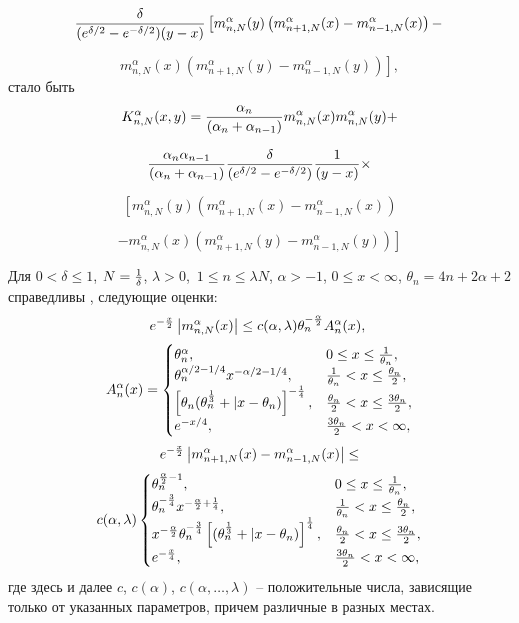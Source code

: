 $$
{\delta\over(e^{\delta/2}-e^{-\delta/2})(y-x)}
\left[m_{n,N}^\alpha(y)\left(m_{n+1,N}^\alpha(x)-m_{n-1,N}^\alpha(x)
\right)-\right.
$$

$$
\left.m_{n,N}^\alpha(x)\left(m_{n+1,N}^\alpha(y)-
m_{n-1,N}^\alpha(y)\right)\right],
$$
стало быть
$$
K_{n,N}^\alpha(x,y)={\alpha_n\over(\alpha_n+\alpha_{n-1})}
m_{n,N}^{\alpha}(x)m_{n,N}^{\alpha}(y)+
$$

$$
{\alpha_n\alpha_{n-1}
\over(\alpha_n+\alpha_{n-1})}{\delta\over(e^{\delta/2}-e^{-\delta/2})} {1\over(y-x)}\times
$$

$$
\left[m_{n,N}^\alpha(y)\left(m_{n+1,N}^\alpha(x)-
m_{n-1,N}^\alpha(x)
\right)\right.
$$

\begin{equation*}\label{Kernel2}
\left.-m_{n,N}^\alpha(x)
\left(m_{n+1,N}^\alpha(y)-m_{n-1,N}^\alpha(y)
\right)\right]
\end{equation*}

Для $0<\delta\le1$, $N={1\over\delta}$, $\lambda>0$,\ $1\le n\le\lambda N$,  $\alpha>-1$, $0\le x<\infty$, $\theta_n=4n+2\alpha+2$ справедливы \cite{Ram1}, \cite{Ram5} следующие оценки:
$$
e^{-{x\over2}}\left|m_{n,N}^\alpha(x)\right|\le c(\alpha,\lambda)\theta_n^{-{\alpha\over2}}A_n^\alpha(x),\
$$
\begin{equation*}
A_n^\alpha(x)=\begin{cases}
\theta_n^{\alpha},&  0\le x\le \frac{1}{\theta_n},\\
\theta_n^{\alpha/2-1/4}x^{-\alpha/2-1/4},&     \frac{1}{\theta_n}<x\le {\theta_n\over 2},\\
\left[\theta_n(\theta_n^{1\over3}+|x-\theta_n)\right]^{-\frac{1}{4}},& {\theta_n\over2}<x\leq{3\theta_n\over2},\\
e^{-{x/4}}, & {3\theta_n\over2}<x<\infty,
\end{cases}
\end{equation*}
$$
e^{-{x\over2}}\left|m_{n+1,N}^{\alpha}(x)-m_{n-1,N}^{\alpha}(x)\right|\leq
$$
$$
c(\alpha,\lambda)\begin{cases}
\theta_n^{{\alpha\over2}-1},&  0\le x\le \frac{1}{\theta_n},\\
\theta_n^{-{3\over4}}x^{-{\alpha\over2}+{1\over4}},&     \frac{1}{\theta_n}<x\le {\theta_n\over 2},\\
x^{-{\alpha\over2}}\theta_n^{-{3\over4}}\left[(\theta_n^{1\over3}+|x-\theta_n)\right]^{1\over4},& {\theta_n\over2}<x\leq{3\theta_n\over2},\\
e^{-{x\over4}}, & {3\theta_n\over2}<x<\infty,
\end{cases}
$$
где здесь и далее $c$, $c(\alpha)$, $c(\alpha, \ldots,\lambda)$ -- положительные числа, зависящие только от указанных параметров, причем различные в разных местах.


